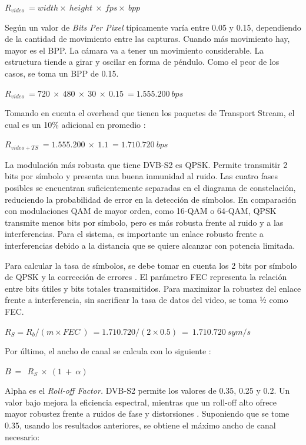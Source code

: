 \documentclass[12pt,a4paper]{article}
\begin{document}
\(R_{video}\  = width \times \ height\  \times \ fps \times \ bpp\)

Según \cite{ref45} un valor de \emph{Bits Per Pixel} típicamente varía entre 0.05 y 0.15, dependiendo de la cantidad de movimiento entre las capturas. Cuando más movimiento hay, mayor es el BPP. La cámara va a tener un movimiento considerable. La estructura tiende a girar y oscilar en forma de péndulo. Como el peor de los casos, se toma un BPP de 0.15.

\(R_{video}\  = 720\  \times \ 480\  \times \ 30\  \times \ 0.15\  = 1.555.200\ bps\ \)

Tomando en cuenta el overhead que tienen los paquetes de Transport Stream, el cual es un 10\% adicional en promedio \cite{ref46}:

\(R_{video + TS}\  = 1.555.200\  \times \ 1.1\  = 1.710.720\ bps\)

La modulación más robusta que tiene DVB-S2 es QPSK. Permite transmitir 2 bits por símbolo y presenta una buena inmunidad al ruido. Las cuatro fases posibles se encuentran suficientemente separadas en el diagrama de constelación, reduciendo la probabilidad de error en la detección de símbolos. En comparación con modulaciones QAM de mayor orden, como 16-QAM o 64-QAM, QPSK transmite menos bits por símbolo, pero es más robusta frente al ruido y a las interferencias. Para el sistema, es importante un enlace robusto frente a interferencias debido a la distancia que se quiere alcanzar con potencia limitada.

Para calcular la tasa de símbolos, se debe tomar en cuenta los 2 bits por símbolo de QPSK y la corrección de errores \cite{ref48}. El parámetro FEC representa la relación entre bits útiles y bits totales transmitidos. Para maximizar la robustez del enlace frente a interferencia, sin sacrificar la tasa de datos del video, se toma ½ como FEC.

\(R_{S} = R_{b}/(m \times FEC\ )\  = 1.710.720/(2 \times 0.5)\  = \ 1.710.720\ sym/s\ \)

Por último, el ancho de canal se calcula con lo siguiente \cite{ref42}:

\(B\  = \ \ \)\(R_{S}\  \times \ (1\  + \ \alpha)\)

Alpha es el \emph{Roll-off Factor.} DVB-S2 permite los valores de 0.35, 0.25 y 0.2. Un valor bajo mejora la eficiencia espectral, mientras que un roll-off alto ofrece mayor robustez frente a ruidos de fase y distorsiones \cite{ref42}. Suponiendo que se tome 0.35, usando los resultados anteriores, se obtiene el máximo ancho de canal necesario:
\end{document}
